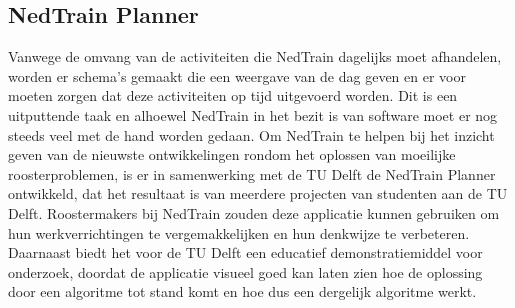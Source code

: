 \subsection{NedTrain Planner}
Vanwege de omvang van de activiteiten die NedTrain dagelijks moet afhandelen, worden er schema's gemaakt die een weergave van de dag geven en er voor moeten zorgen dat deze activiteiten op tijd uitgevoerd worden. Dit is een uitputtende taak en alhoewel NedTrain in het bezit is van software moet er nog steeds veel met de hand worden gedaan. Om NedTrain te helpen bij het inzicht geven van de nieuwste ontwikkelingen rondom het oplossen van moeilijke roosterproblemen, is er in samenwerking met de TU Delft de NedTrain Planner ontwikkeld, dat het resultaat is van meerdere projecten van studenten aan de TU Delft. Roostermakers bij NedTrain zouden deze applicatie kunnen gebruiken om hun werkverrichtingen te vergemakkelijken en hun denkwijze te verbeteren. Daarnaast biedt het voor de TU Delft een educatief demonstratiemiddel voor onderzoek, doordat de applicatie visueel goed kan laten zien hoe de oplossing door een algoritme tot stand komt en hoe dus een dergelijk algoritme werkt.
